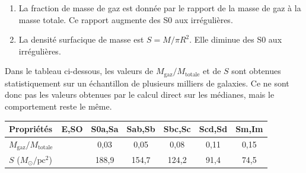 \documentclass[a4paper,10pt]{report}
\newcounter{noexo}
\newenvironment{Exercise}[1][]{%
  \refstepcounter{noexo}
  \medskip\noindent\textbf{Exercice~\thenoexo~:~#1}
  \medskip\par
  \addcontentsline{toc}{paragraph}{Exercice~\thenoexo~:~#1}
  \label{exo:\thenoexo}
}{}
\renewcommand{\u}[1]{\ensuremath{\mathrm{#1}}} %
\begin{document}
\begin{Answer}
  \begin{enumerate}
  \item La fraction de masse de gaz est donnée par le rapport de la
    masse de gaz à la masse totale. Ce rapport augmente des S0 aux
    irrégulières.
  \item La densité surfacique de masse est $S = M/ \pi R^2$. Elle
    diminue des S0 aux irrégulières.
  \end{enumerate}

  Dans le tableau ci-dessous, les valeurs de
  $M_{\mathrm{gaz}}/M_{\mathrm{totale}}$ et de $S$ sont obtenues
  statistiquement sur un échantillon de plusieurs milliers de
  galaxies. Ce ne sont donc pas les valeurs obtenues par le calcul
  direct sur les médianes, mais le comportement reste le même.
  \begin{center}
    \begin{tabular}{lcccccc}
      \hline
      Propriétés & E,SO & S0a,Sa & Sab,Sb & Sbc,Sc & Scd,Sd & Sm,Im \\
      \hline
      \hline
      $M_{\mathrm{gaz}}/M_{\mathrm{totale}}$ & & 0,03 & 0,05 & 0,08 & 0,11 & 0,15 \\
      $S$ ($M_{\odot}/\u{pc}^2$) &  & 188,9 & 154,7 & 124,2 & 91,4 & 74,5 \\
      \hline
    \end{tabular}
  \end{center}
\end{Answer}


\end{document}
